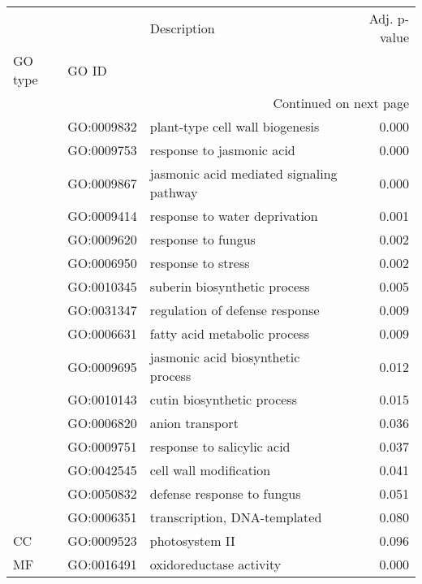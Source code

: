 \begin{longtable}{lllr}
\toprule
   &            &                               Description &  Adj. p-value \\
GO type & GO ID &                                           &               \\
\midrule
\endhead
\midrule
\multicolumn{4}{r}{{Continued on next page}} \\
\midrule
\endfoot

\bottomrule
\endlastfoot
\multirow{16}{*}{BP} & GO:0009832 &           plant-type cell wall biogenesis &         0.000 \\
   & GO:0009753 &                 response to jasmonic acid &         0.000 \\
   & GO:0009867 &  jasmonic acid mediated signaling pathway &         0.000 \\
   & GO:0009414 &             response to water deprivation &         0.001 \\
   & GO:0009620 &                        response to fungus &         0.002 \\
   & GO:0006950 &                        response to stress &         0.002 \\
   & GO:0010345 &              suberin biosynthetic process &         0.005 \\
   & GO:0031347 &            regulation of defense response &         0.009 \\
   & GO:0006631 &              fatty acid metabolic process &         0.009 \\
   & GO:0009695 &        jasmonic acid biosynthetic process &         0.012 \\
   & GO:0010143 &                cutin biosynthetic process &         0.015 \\
   & GO:0006820 &                           anion transport &         0.036 \\
   & GO:0009751 &                response to salicylic acid &         0.037 \\
   & GO:0042545 &                    cell wall modification &         0.041 \\
   & GO:0050832 &                defense response to fungus &         0.051 \\
   & GO:0006351 &              transcription, DNA-templated &         0.080 \\
\cline{1-4}
CC & GO:0009523 &                            photosystem II &         0.096 \\
MF & GO:0016491 &                   oxidoreductase activity &         0.000 \\
\end{longtable}
